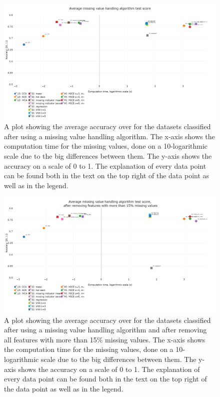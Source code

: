 \documentclass[10pt,a4paper]{report}
\begin{document}
	\begin{figure}[H]
		\centering
		\includegraphics[angle=90,height=0.9\textheight]{avg_acc.PNG}
		\caption{A plot showing the average accuracy over for the datasets classified after using a missing value handling algorithm. The x-axis shows the computation time for the missing values, done on a 10-logarithmic scale due to the big differences between them. The y-axis shows the accuracy on a scale of 0 to 1. The explanation of every data point can be found both in the text on the top right of the data point as well as in the legend.}
		\label{fig:EvalAvgAcc}
	\end{figure}
	
	\begin{figure}[H]
		\centering
		\includegraphics[angle=90,height=0.9\textheight]{avg_acc_15aca.PNG}
		\caption{A plot showing the average accuracy over for the datasets classified after using a missing value handling algorithm and after removing all features with more than 15\% missing values. The x-axis shows the computation time for the missing values, done on a 10-logarithmic scale due to the big differences between them. The y-axis shows the accuracy on a scale of 0 to 1. The explanation of every data point can be found both in the text on the top right of the data point as well as in the legend.}
		\label{fig:EvalAvgAccExtraACA}
	\end{figure}
	
\end{document}
